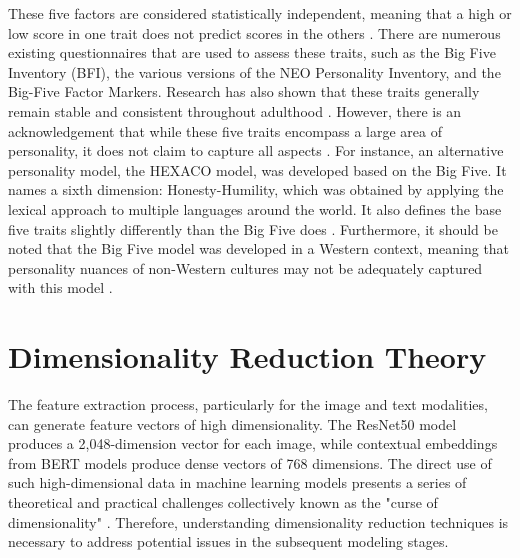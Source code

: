 These five factors are considered statistically independent, meaning that a high or low score in one trait does not predict scores in the others \citep{babcock2020big}. There are numerous existing questionnaires that are used to assess these traits, such as the Big Five Inventory (BFI), the various versions of the NEO Personality Inventory, and the Big-Five Factor Markers. Research has also shown that these traits generally remain stable and consistent throughout adulthood \citep{babcock2020big}. However, there is an acknowledgement that while these five traits encompass a large area of personality, it does not claim to capture all aspects \citep{babcock2020big}. For instance, an alternative personality model, the HEXACO model, was developed based on the Big Five. It names a sixth dimension: Honesty-Humility, which was obtained by applying the lexical approach to multiple languages around the world. It also defines the base five traits slightly differently than the Big Five does \citep{feher2021looking}. Furthermore, it should be noted that the Big Five model was developed in a Western context, meaning that personality nuances of non-Western cultures may not be adequately captured with this model \citep{feher2021looking}.

\section{Dimensionality Reduction Theory}
\label{sec:theory_pca}
The feature extraction process, particularly for the image and text modalities, can generate feature vectors of high dimensionality. The ResNet50 model produces a 2,048-dimension vector for each image, while contextual embeddings from BERT models produce dense vectors of 768 dimensions. The direct use of such high-dimensional data in machine learning models presents a series of theoretical and practical challenges collectively known as the "curse of dimensionality" \citep{bellman1961, bellman1966}. Therefore, understanding dimensionality reduction techniques is necessary to address potential issues in the subsequent modeling stages.

